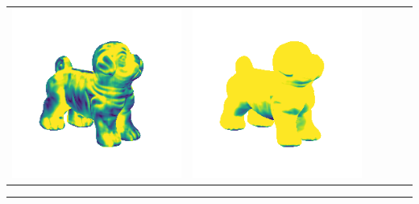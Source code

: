 \begin{tabularx}{\linewidth}{@{}Y@{}Y@{}Y@{}Y@{}Y@{}Y@{}}
\includegraphics[width=\linewidth]{semisynthetic/20150514_17_marrnet_err.png} &
\includegraphics[width=\linewidth]{semisynthetic/20150514_17_ef_err.png} \\
\end{tabularx}
\begin{center}\rule{0.5\linewidth}{\linethickness}\end{center}

